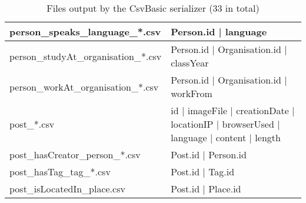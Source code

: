 \begin{table}[htb]
\begin{tabular}{|p{4.6cm}|p{9.8cm}|}
        person\_speaks\_language\_*.csv         & Person.id | language                                                                    \\ \hline
        person\_studyAt\_organisation\_*.csv    & Person.id | Organisation.id | classYear                                                 \\ \hline
        person\_workAt\_organisation\_*.csv     & Person.id | Organisation.id | workFrom                                                  \\ \hline
        post\_*.csv                             & id | imageFile | creationDate | locationIP | browserUsed | language | content | length  \\ \hline
        post\_hasCreator\_person\_*.csv         & Post.id | Person.id                                                                     \\ \hline
        post\_hasTag\_tag\_*.csv                & Post.id | Tag.id                                                                        \\ \hline
        post\_isLocatedIn\_place.csv            & Post.id | Place.id                                                                      \\ \hline
    \end{tabular}
    \caption{Files output by the CsvBasic serializer (33 in total)}
    \label{table:csv_basic}
\end{table}
